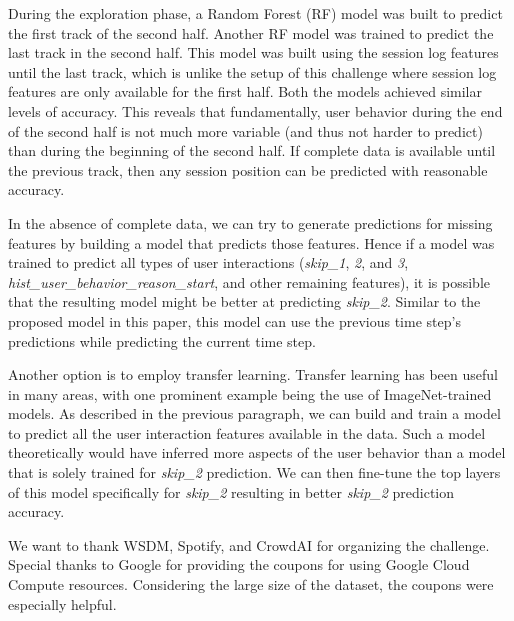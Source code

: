 \documentclass[sigconf]{acmart}
\begin{document}
During the exploration phase, a Random Forest (RF) model was built to predict the first track of the second half. Another RF model was trained to predict the last track in the second half. This model was built using the session log features until the last track, which is unlike the setup of this challenge where session log features are only available for the first half. Both the models achieved similar levels of accuracy. This reveals that fundamentally, user behavior during the end of the second half is not much more variable (and thus not harder to predict) than during the beginning of the second half. If complete data is available until the previous track, then any session position can be predicted with reasonable accuracy.

In the absence of complete data, we can try to generate predictions for missing features by building a model that predicts those features. Hence if a model was trained to predict all types of user interactions (\textit{skip\_1}, \textit{2}, and \textit{3}, \textit{hist\_user\_behavior\_reason\_start}, and other remaining features), it is possible that the resulting model might be better at predicting \textit{skip\_2}. Similar to the proposed model in this paper, this model can use the previous time step's predictions while predicting the current time step.

Another option is to employ transfer learning. Transfer learning has been useful in many areas, with one prominent example being the use of ImageNet-trained models\cite{huh2016makes}. As described in the previous paragraph, we can build and train a model to predict all the user interaction features available in the data. Such a model theoretically would have inferred more aspects of the user behavior than a model that is solely trained for \textit{skip\_2} prediction. We can then fine-tune the top layers of this model specifically for \textit{skip\_2} resulting in better \textit{skip\_2} prediction accuracy.

%
\begin{acks}
We want to thank WSDM, Spotify, and CrowdAI for organizing the challenge. Special thanks to Google for providing the coupons for using Google Cloud Compute resources. Considering the large size of the dataset, the coupons were especially helpful.
\end{acks}

%


\end{document}
